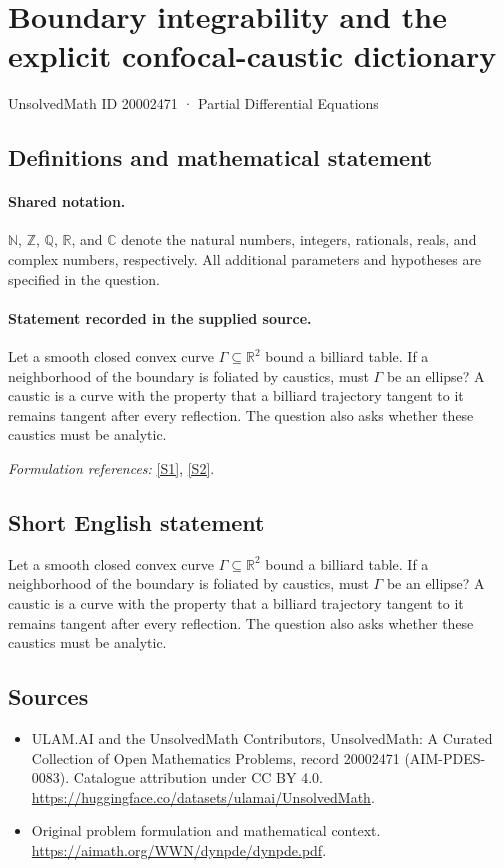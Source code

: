 \documentclass[11pt]{article}
\newcommand{\sref}[2]{\hyperlink{source:#1:#2}{[S#2]}}
\begin{document}
\setcounter{section}{20002470}
\section{Boundary integrability and the explicit confocal-caustic dictionary}\label{20002471}
{\small UnsolvedMath ID 20002471 · Partial Differential Equations}
\subsection{Definitions and mathematical statement}

\paragraph{Shared notation.}$\mathbb N$, $\mathbb Z$, $\mathbb Q$, $\mathbb R$, and $\mathbb C$ denote the natural numbers, integers, rationals, reals, and complex numbers, respectively. All additional parameters and hypotheses are specified in the question.


\paragraph{Statement recorded in the supplied source.}
Let a smooth closed convex curve $\Gamma\subseteq\mathbb R^2$ bound a billiard table. If a neighborhood of the boundary is foliated by caustics, must $\Gamma$ be an ellipse? A caustic is a curve with the property that a billiard trajectory tangent to it remains tangent after every reflection. The question also asks whether these caustics must be analytic.
\par\smallskip\textit{Formulation references:} \sref{20002471}{1}, \sref{20002471}{2}.
\subsection{Short English statement}
Let a smooth closed convex curve $\Gamma\subseteq\mathbb R^2$ bound a billiard table. If a neighborhood of the boundary is foliated by caustics, must $\Gamma$ be an ellipse? A caustic is a curve with the property that a billiard trajectory tangent to it remains tangent after every reflection. The question also asks whether these caustics must be analytic.
\subsection{Sources}
\begin{itemize}
\item[\hypertarget{source:20002471:1}{S1}] ULAM.AI and the UnsolvedMath Contributors, UnsolvedMath: A Curated Collection of Open Mathematics Problems, record 20002471 (AIM-PDES-0083). Catalogue attribution under CC BY 4.0.
\url{https://huggingface.co/datasets/ulamai/UnsolvedMath}.
\item[\hypertarget{source:20002471:2}{S2}] Original problem formulation and mathematical context.
\url{https://aimath.org/WWN/dynpde/dynpde.pdf}.
\end{itemize}
\label{end:20002471}
\end{document}
